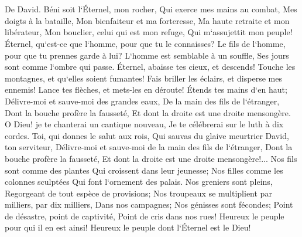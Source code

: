 \chapter{}

\verse De David. Béni soit l`Éternel, mon rocher, Qui exerce mes mains au combat, Mes doigts à la bataille, 
\verse Mon bienfaiteur et ma forteresse, Ma haute retraite et mon libérateur, Mon bouclier, celui qui est mon refuge, Qui m`assujettit mon peuple! 
\verse Éternel, qu`est-ce que l`homme, pour que tu le connaisses? Le fils de l`homme, pour que tu prennes garde à lui? 
\verse L`homme est semblable à un souffle, Ses jours sont comme l`ombre qui passe. 
\verse Éternel, abaisse tes cieux, et descends! Touche les montagnes, et qu`elles soient fumantes! 
\verse Fais briller les éclairs, et disperse mes ennemis! Lance tes flèches, et mets-les en déroute! 
\verse Étends tes mains d`en haut; Délivre-moi et sauve-moi des grandes eaux, De la main des fils de l`étranger, 
\verse Dont la bouche profère la fausseté, Et dont la droite est une droite mensongère. 
\verse O Dieu! je te chanterai un cantique nouveau, Je te célébrerai sur le luth à dix cordes. 
\verse Toi, qui donnes le salut aux rois, Qui sauvas du glaive meurtrier David, ton serviteur, 
\verse Délivre-moi et sauve-moi de la main des fils de l`étranger, Dont la bouche profère la fausseté, Et dont la droite est une droite mensongère!... 
\verse Nos fils sont comme des plantes Qui croissent dans leur jeunesse; Nos filles comme les colonnes sculptées Qui font l`ornement des palais. 
\verse Nos greniers sont pleins, Regorgeant de tout espèce de provisions; Nos troupeaux se multiplient par milliers, par dix milliers, Dans nos campagnes; 
\verse Nos génisses sont fécondes; Point de désastre, point de captivité, Point de cris dans nos rues! 
\verse Heureux le peuple pour qui il en est ainsi! Heureux le peuple dont l`Éternel est le Dieu! 

\chapter{}

